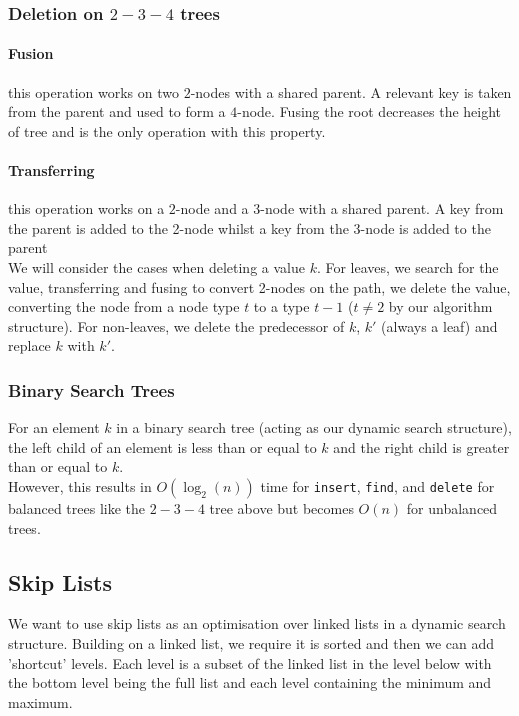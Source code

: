 \documentclass[a4paper, 12pt, twoside]{article}
\begin{document}
\subsubsection{Deletion on $2-3-4$ trees}

\paragraph{Fusion} this operation works on two $2$-nodes with a shared parent. A relevant key
is taken from the parent and used to form a $4$-node. Fusing the root decreases the height of 
tree and is the only operation with this property.

\paragraph{Transferring} this operation works on a $2$-node and a $3$-node with a shared parent.
A key from the parent is added to the 2-node whilst a key from the 3-node is added to the parent
\\[\baselineskip]
We will consider the cases when deleting a value $k$. For leaves, we search for the value,
transferring and fusing to convert 2-nodes on the path, we delete the value, converting the
node from a node type $t$ to a type $t - 1$ ($t \neq 2$ by our algorithm structure). For
non-leaves, we delete the predecessor of $k$, $k'$ (always a leaf) and replace $k$ with $k'$.

\subsubsection{Binary Search Trees}

For an element $k$ in a binary search tree (acting as our dynamic search structure), 
the left child of an element is less than or equal to $k$ and the right child is 
greater than or equal to $k$.
\\[\baselineskip]
However, this results in $O(\log_2(n))$ time for \texttt{insert}, \texttt{find}, 
and \texttt{delete} for balanced trees like the $2-3-4$ tree above 
but becomes $O(n)$ for unbalanced trees.

\subsection{Skip Lists}

We want to use skip lists as an optimisation over linked lists in a
dynamic search structure. Building on a linked list, we require it is sorted and then 
we can add 'shortcut' levels. Each level is a subset of the linked list in 
the level below with the bottom level being the full list and each level containing
the minimum and maximum.
\end{document}
